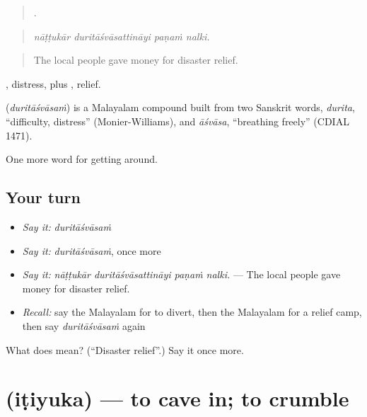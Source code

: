 \begin{quote}
   .
\end{quote}

\begin{quote}
\emph{nāṭṭukār duritāśvāsattināyi paṇaṁ nalki.}
\end{quote}

\begin{quote}
The local people gave money for disaster relief.
\end{quote}

, distress, plus , relief.

\begin{cousinweb}
\textbf{} (\emph{duritāśvāsaṁ}) is a Malayalam compound built from two Sanskrit words, \emph{durita}, \textquotedblleft{}difficulty, distress\textquotedblright{} (Monier-Williams), and \emph{āśvāsa}, \textquotedblleft{}breathing freely\textquotedblright{} (CDIAL 1471).
\end{cousinweb}

\begin{grammarlens}[title={What you've built}]
One more word for getting around.
\end{grammarlens}

\subsection*{Your turn}
\begin{itemize}
\raggedright
  \item \emph{Say it:} \emph{duritāśvāsaṁ}
  \item \emph{Say it:} \emph{duritāśvāsaṁ}, once more
  \item \emph{Say it:} \emph{nāṭṭukār duritāśvāsattināyi paṇaṁ nalki.} — The local people gave money for disaster relief.
  \item \emph{Recall:} say the Malayalam for to divert, then the Malayalam for a relief camp, then say \emph{duritāśvāsaṁ} again
\end{itemize}

\begin{tcolorbox}[breakable,colback=teal!4,colframe=teal!35!black,title={Before you move on}]
What does  mean? (\textquotedblleft{}Disaster relief\textquotedblright{}.) Say it once more.
\end{tcolorbox}
\section[\texorpdfstring{\ml{ഇടിയുക} (iṭiyuka)}{ഇടിയുക (iṭiyuka)}]{ (iṭiyuka) — to cave in; to crumble}

